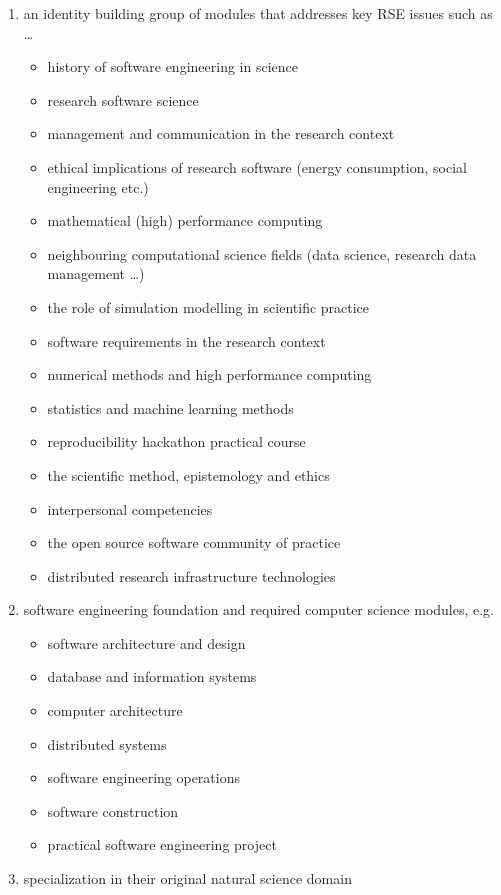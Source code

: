 \documentclass[
        twocolumn,german,biblatex
    ]{article}
\providecommand{\tightlist}{%
    \setlength{\itemsep}{0pt}\setlength{\parskip}{0pt}}
\begin{document}
    \begin{enumerate}
    \def\labelenumi{\arabic{enumi}.}
    \tightlist
    \item
      an identity building group of modules that addresses key RSE
      issues such as \ldots{}

      \begin{itemize}
      \tightlist
      \item
        history of software engineering in science
        \autocite{leroy_when_2021}
      \item
        research software science
        \autocite{felderer_investigating_2025,heroux_research_2022}
      \item
        management and communication in the research context
      \item
        ethical implications of research software (energy consumption,
        social engineering etc.)
      \item
        mathematical (high) performance computing
      \item
        neighbouring computational science fields (data science,
        research data management \ldots)
      \item
        the role of simulation modelling in scientific practice
      \item
        software requirements in the research context
      \item
        numerical methods and high performance computing
      \item
        statistics and machine learning methods
      \item
        reproducibility hackathon practical course
      \item
        the scientific method, epistemology and ethics
      \item
        interpersonal competencies
      \item
        the open source software community of practice
      \item
        distributed research infrastructure technologies
      \end{itemize}
    \item
      software engineering foundation and required computer science
      modules, e.g.

      \begin{itemize}
      \tightlist
      \item
        software architecture and design
      \item
        database and information systems
      \item
        computer architecture
      \item
        distributed systems
      \item
        software engineering operations
      \item
        software construction
      \item
        practical software engineering project
      \end{itemize}
    \item
      specialization in their original natural science domain


\end{enumerate}
\end{document}
